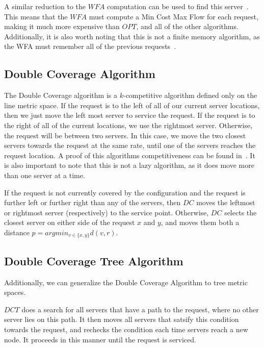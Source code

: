A similar reduction to the $WFA$ computation can be used to find this server~\cite{WFA2009}. This means that the $WFA$ must compute a Min Cost Max Flow for each request, making it much more expensive than $OPT$, and all of the other algorithms. Additionally, it is also worth noting that this is not a finite memory algorithm, as the WFA must remember all of the previous requests~\cite{MAXMAX2005}. 

\subsection{Double Coverage Algorithm}
\label{sec:DC}
The Double Coverage algorithm is a $k$-competitive algorithm defined only on the line metric space. If the request is to the left of all of our current server locations, then we just move the left most server to service the request. If the request is to the right of all of the current locations, we use the rightmost server. Otherwise, the request will be between two servers. In this case, we move the two closest servers towards the request at the same rate, until one of the servers reaches the request location. A proof of this algorithms competitiveness can be found in~\cite{OnlineComp1998}. It is also important to note that this is not a lazy algorithm, as it does move more than one server at a time. 

\begin{definition}
    If the request is not currently covered by the configuration and the request is further left or further right than any of the servers, then $DC$ moves the leftmost or rightmost server (respectively) to the service point. Otherwise, $DC$ selects the closest server on either side of the request $x$ and $y$, and moves them both a distance $p = argmin_{v \in \{x, y\}} d(v, r)$.
\end{definition}

\subsection{Double Coverage Tree Algorithm}
Additionally, we can generalize the Double Coverage Algorithm to tree metric spaces. 

\begin{definition}
    $DCT$ does a search for all servers that have a path to the request, where no other server lies on this path. It then moves all servers that satsify this condition towards the request, and rechecks the condition each time servers reach a new node. It proceeds in this manner until the request is serviced.
\end{definition}

